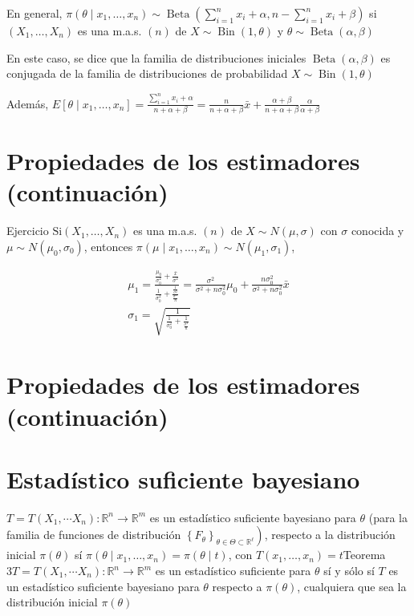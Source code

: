 En general, $\pi\left(\theta \mid x_{1}, \ldots, x_{n}\right) \sim \operatorname{Beta}\left(\sum_{i=1}^{n} x_{i}+\alpha, n-\sum_{i=1}^{n} x_{i}+\beta\right)$ si $\left(X_{1}, \ldots, X_{n}\right)$ es una m.a.s. $(n)$ de $X \sim \operatorname{Bin}(1, \theta)$ y $\theta \sim \operatorname{Beta}(\alpha, \beta)$

En este caso, se dice que la familia de distribuciones iniciales $\operatorname{Beta}(\alpha, \beta)$ es conjugada de la familia de distribuciones de probabilidad $X \sim \operatorname{Bin}(1, \theta)$

Además, $E\left[\theta \mid x_{1}, \ldots, x_{n}\right]=\frac{\sum_{i=1}^{n} x_{i}+\alpha}{n+\alpha+\beta}=\frac{n}{n+\alpha+\beta} \bar{x}+\frac{\alpha+\beta}{n+\alpha+\beta} \frac{\alpha}{\alpha+\beta}$

\section*{Propiedades de los estimadores (continuación)}
Ejercicio $\mathrm{Si}\left(X_{1}, \ldots, X_{n}\right)$ es una m.a.s. $(n)$ de $X \sim N(\mu, \sigma)$ con $\sigma$ conocida y $\mu \sim N\left(\mu_{0}, \sigma_{0}\right)$, entonces $\pi\left(\mu \mid x_{1}, \ldots, x_{n}\right) \sim N\left(\mu_{1}, \sigma_{1}\right)$,

$$
  \begin{gathered}
    \mu_{1}=\frac{\frac{\mu_{0}}{\sigma_{0}^{2}}+\frac{\bar{x}}{\sigma^{2}}}{\frac{1}{\sigma_{0}^{2}}+\frac{\frac{1}{\sigma^{2}}}{\frac{\sigma^{n}}{n}}}=\frac{\sigma^{2}}{\sigma^{2}+n \sigma_{0}^{2}} \mu_{0}+\frac{n \sigma_{0}^{2}}{\sigma^{2}+n \sigma_{0}^{2}} \bar{x} \\
    \sigma_{1}=\sqrt{\frac{1}{\frac{1}{\sigma_{0}^{2}}+\frac{1}{\frac{\sigma^{2}}{n}}}}
  \end{gathered}
$$

\section*{Propiedades de los estimadores (continuación)}
\section*{Estadístico suficiente bayesiano}
$T=T\left(X_{1}, \cdots X_{n}\right): \mathbb{R}^{n} \longrightarrow \mathbb{R}^{m}$ es un estadístico suficiente bayesiano para $\theta$ (para la familia de funciones de distribución $\left.\left\{F_{\theta}\right\}_{\theta \in \Theta \subset \mathbb{R}^{\ell}}\right)$, respecto a la distribución inicial $\pi(\theta)$ sí $\pi\left(\theta \mid x_{1}, \ldots, x_{n}\right)=\pi(\theta \mid t)$, con $T\left(x_{1}, \ldots, x_{n}\right)=t$Teorema $3 T=T\left(X_{1}, \cdots X_{n}\right): \mathbb{R}^{n} \longrightarrow \mathbb{R}^{m}$ es un estadístico suficiente para $\theta$ sí y sólo sí $T$ es un estadístico suficiente bayesiano para $\theta$ respecto a $\pi(\theta)$, cualquiera que sea la distribución inicial $\pi(\theta)$


